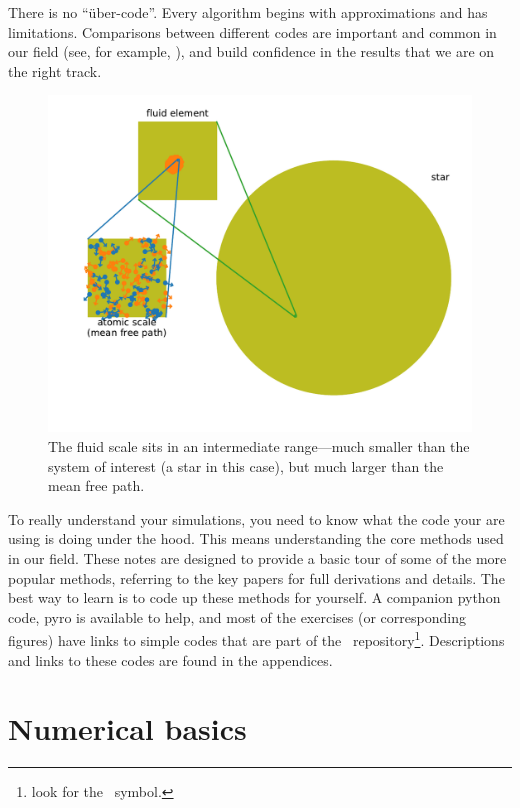 There is no ``\"uber-code''.  Every algorithm begins with
approximations and has limitations.  
Comparisons between different codes are important and common in our
field (see, for example,
\cite{frenk:1999,dimonte:2004,devalborro:2006}), and build confidence
in the results that we are on the right track.

%
\begin{figure}[t]
\centering
\includegraphics[width=0.9\linewidth]{fluid_scale}
\caption[The fluid scale.]{\label{fig:intro:fluid_scale} The fluid
  scale sits in an intermediate range---much smaller than the system
  of interest (a star in this case), but much larger than the mean
  free path.}
\end{figure}
%

To really understand your simulations, you need to know what the code
your are using is doing under the hood.  This means understanding the
core methods used in our field.  These notes are designed to provide a
basic tour of some of the more popular methods, referring to the key
papers for full derivations and details.  The best way to learn is to
code up these methods for yourself.  A companion python code, {\sf
  pyro} is available to help, and most of the exercises (or
corresponding figures) have links to simple codes that are part of the \hydroex\
repository\footnote{look for the \hydroexsymb\ symbol.}. Descriptions
and links to these codes are found in the appendices.


\section{Numerical basics}

